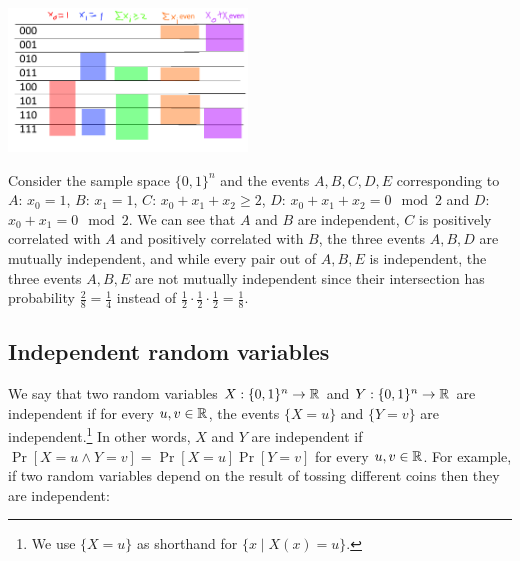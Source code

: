 \begin{marginfigure}
\centering
\includegraphics[width=\linewidth, height=1.5in, keepaspectratio]{../figure/independencecoins.png}
\caption{Consider the sample space \(\{0,1\}^n\) and the events
\(A,B,C,D,E\) corresponding to \(A\): \(x_0=1\), \(B\): \(x_1=1\),
\(C\): \(x_0+x_1+x_2 \geq 2\), \(D\): \(x_0+x_1+x_2 = 0 \mod 2\) and
\(D\): \(x_0+x_1 = 0 \mod 2\). We can see that \(A\) and \(B\) are
independent, \(C\) is positively correlated with \(A\) and positively
correlated with \(B\), the three events \(A,B,D\) are mutually
independent, and while every pair out of \(A,B,E\) is independent, the
three events \(A,B,E\) are not mutually independent since their
intersection has probability \(\tfrac{2}{8}=\tfrac{1}{4}\) instead of
\(\tfrac{1}{2}\cdot \tfrac{1}{2} \cdot \tfrac{1}{2} = \tfrac{1}{8}\).}
\label{independencecoinsfig}
\end{marginfigure}

\subsection{Independent random
variables}\label{Independent-random-variab}

We say that two random variables \(X:\{0,1\}^n \rightarrow {\mathbb{R}}\) and
\(Y:\{0,1\}^n \rightarrow {\mathbb{R}}\) are independent if for every
\(u,v \in {\mathbb{R}}\), the events \(\{ X=u \}\) and \(\{ Y=v \}\) are
independent.\footnote{We use \(\{ X=u \}\) as shorthand for
  \(\{ x \;|\; X(x)=u \}\).} In other words, \(X\) and \(Y\) are
independent if \(\Pr[ X=u \wedge Y=v]=\Pr[X=u]\Pr[Y=v]\) for every
\(u,v \in {\mathbb{R}}\). For example, if two random variables depend on the
result of tossing different coins then they are independent:

\hypertarget{indcoins}{}

